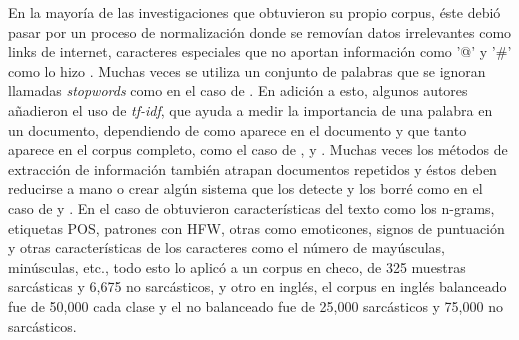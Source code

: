 		\par En la mayoría de las investigaciones que obtuvieron su propio corpus, éste debió pasar por un proceso de normalización donde se removían datos irrelevantes como links de internet, caracteres especiales que no aportan información como '@' y '\#' como lo hizo \cite{lopez2016character}. Muchas veces se utiliza un conjunto de palabras que se ignoran llamadas \textit{\gls{stopwords}} como en el caso de \cite{reyes2012making}. En adición a esto, algunos autores añadieron el uso de \textit{\gls{tf-idf}}, que ayuda a medir la importancia de una palabra en un documento, dependiendo de como aparece en el documento y que tanto aparece en el corpus completo, como el caso de \cite{reyes2012making}, \cite{wallace2015sparse} y \cite{bamman2015contextualized}. Muchas veces los métodos de extracción de información también atrapan documentos repetidos y éstos deben reducirse a mano o crear algún sistema que los detecte y los borré como en el caso de \cite{charalampakis2015detecting} y \cite{reyes2012making}. En el caso de \cite{ptavcek2014sarcasm} obtuvieron características del texto como los \gls{n-grams}, etiquetas \gls{POS}, patrones con \gls{HFW}, otras como emoticones, signos de puntuación y otras características de los caracteres como el número de mayúsculas, minúsculas, etc., todo esto lo aplicó a un corpus en checo, de 325 muestras sarcásticas y 6,675 no sarcásticos, y otro en inglés, el corpus en inglés balanceado fue de 50,000 cada clase y el no balanceado fue de 25,000 sarcásticos y 75,000 no sarcásticos.
